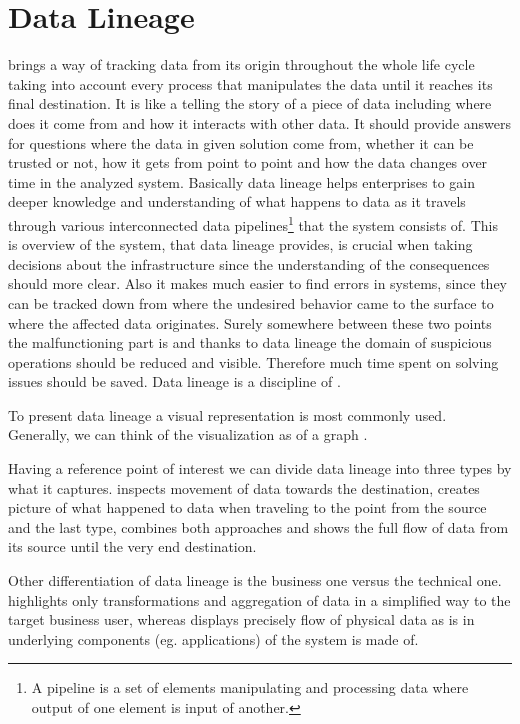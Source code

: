 \chapter{Data Lineage}

 brings a way of tracking data from its origin throughout the whole life cycle taking into account every process that manipulates the data until it reaches its final destination. It is like a telling the story of a piece of data including where does it come from and how it interacts with other data.
It should provide answers for questions where the data in given solution come from, whether it can be trusted or not, how it gets from point to point and how the data changes over time in the analyzed system.
Basically data lineage helps enterprises to gain deeper knowledge and understanding of what happens to data as it travels through various interconnected data pipelines\footnote{A pipeline is a set of elements manipulating and processing data where output of one element is input of another.} that the system consists of. 
This is overview of the system, that data lineage provides, is crucial when taking decisions about the infrastructure since the understanding of the consequences should more clear. Also it makes much easier to find errors in systems, since they can be tracked down from where the undesired behavior came to the surface to where the affected data originates. Surely somewhere between these two points the malfunctioning part is and thanks to data lineage the domain of suspicious operations should be reduced and visible. 
Therefore much time spent on solving issues should be saved.
Data lineage is a discipline of . 

To present data lineage a visual representation is most commonly used. Generally, we can think of the visualization as of a graph .

Having a reference point of interest we can divide data lineage into three types by what it captures.  inspects movement of data towards the destination,  creates picture of what happened to data when traveling to the point from the source and the last type,  combines both approaches and shows the full flow of data from its source until the very end destination.

Other differentiation of data lineage is the business one versus the technical one.
 highlights only transformations and aggregation of data in a simplified way to the target business user, whereas  displays precisely flow of physical data as is in underlying components (eg. applications) of the system is made of.


